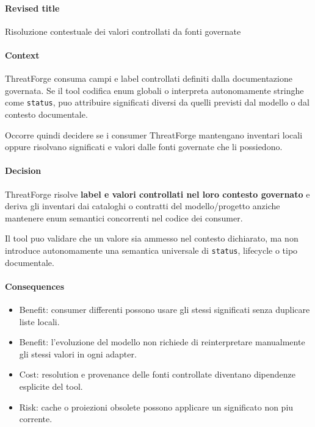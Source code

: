 \documentclass[
  10pt,
]{article}
\providecommand{\tightlist}{%
  \setlength{\itemsep}{0pt}\setlength{\parskip}{0pt}}
\begin{document}
\paragraph{Revised title}\label{revised-title-3}

Risoluzione contestuale dei valori controllati da fonti governate

\paragraph{Context}\label{context-7}

ThreatForge consuma campi e label controllati definiti dalla
documentazione governata. Se il tool codifica enum globali o interpreta
autonomamente stringhe come \texttt{status}, puo attribuire significati
diversi da quelli previsti dal modello o dal contesto documentale.

Occorre quindi decidere se i consumer ThreatForge mantengano inventari
locali oppure risolvano significati e valori dalle fonti governate che
li possiedono.

\paragraph{Decision}\label{decision-7}

ThreatForge risolve \textbf{label e valori controllati nel loro contesto
governato} e deriva gli inventari dai cataloghi o contratti del
modello/progetto anziche mantenere enum semantici concorrenti nel codice
dei consumer.

Il tool puo validare che un valore sia ammesso nel contesto dichiarato,
ma non introduce autonomamente una semantica universale di
\texttt{status}, lifecycle o tipo documentale.

\paragraph{Consequences}\label{consequences-7}

\begin{itemize}
\tightlist
\item
  Benefit: consumer differenti possono usare gli stessi significati
  senza duplicare liste locali.
\item
  Benefit: l'evoluzione del modello non richiede di reinterpretare
  manualmente gli stessi valori in ogni adapter.
\item
  Cost: resolution e provenance delle fonti controllate diventano
  dipendenze esplicite del tool.
\item
  Risk: cache o proiezioni obsolete possono applicare un significato non
  piu corrente.
\end{itemize}
\end{document}
